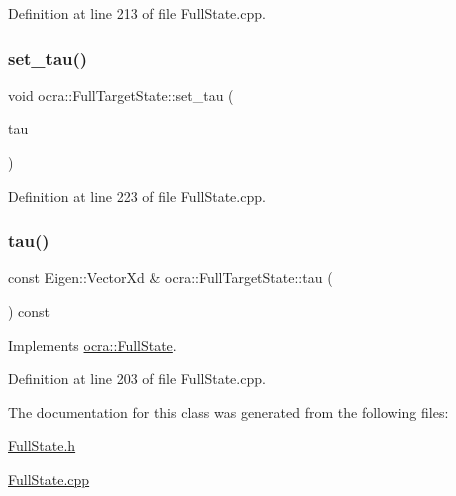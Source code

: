 Definition at line 213 of file Full\+State.\+cpp.

\hypertarget{classocra_1_1FullTargetState_a351cd0cf06d81362558128b0d8d4149a}{}\label{classocra_1_1FullTargetState_a351cd0cf06d81362558128b0d8d4149a} 
\subsubsection{\texorpdfstring{set\+\_\+tau()}{set\_tau()}}
{\footnotesize\ttfamily void ocra\+::\+Full\+Target\+State\+::set\+\_\+tau (\begin{DoxyParamCaption}\item[{const Eigen\+::\+Vector\+Xd \&}]{tau }\end{DoxyParamCaption})}



Definition at line 223 of file Full\+State.\+cpp.

\hypertarget{classocra_1_1FullTargetState_a56855f5d42e84f456a89fd259c4b7edb}{}\label{classocra_1_1FullTargetState_a56855f5d42e84f456a89fd259c4b7edb} 
\subsubsection{\texorpdfstring{tau()}{tau()}}
{\footnotesize\ttfamily const Eigen\+::\+Vector\+Xd \& ocra\+::\+Full\+Target\+State\+::tau (\begin{DoxyParamCaption}{ }\end{DoxyParamCaption}) const\hspace{0.3cm}{\ttfamily [virtual]}}



Implements \hyperlink{classocra_1_1FullState_a24723b4a382c2bf51e6c32cbd1bd7b06}{ocra\+::\+Full\+State}.



Definition at line 203 of file Full\+State.\+cpp.



The documentation for this class was generated from the following files\+:\begin{DoxyCompactItemize}
\item 
\hyperlink{FullState_8h}{Full\+State.\+h}\item 
\hyperlink{FullState_8cpp}{Full\+State.\+cpp}\end{DoxyCompactItemize}
